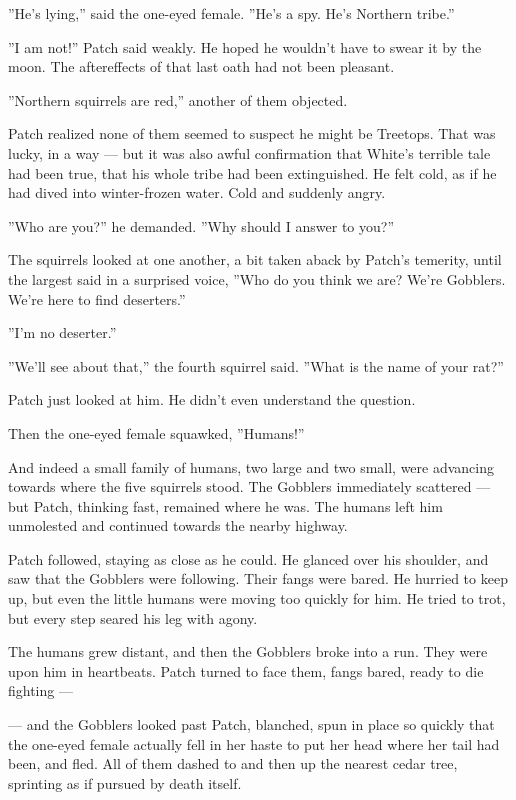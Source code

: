 \documentclass[12pt]{book}
\begin{document}
''He's lying,'' said the one-eyed female. ''He's a spy. He's Northern
tribe.''

''I am not!'' Patch said weakly. He hoped he wouldn't have to swear it
by the moon. The aftereffects of that last oath had not been pleasant.

''Northern squirrels are red,'' another of them objected.

Patch realized none of them seemed to suspect he might be
Treetops. That was lucky, in a way --- but it was also awful
confirmation that White's terrible tale had been true, that his whole
tribe had been extinguished. He felt cold, as if he had dived into
winter-frozen water. Cold and suddenly angry.

''Who are you?'' he demanded. ''Why should I answer to you?''

The squirrels looked at one another, a bit taken aback by Patch's
temerity, until the largest said in a surprised voice, ''Who do you
think we are? We're Gobblers. We're here to find deserters.''

''I'm no deserter.''

''We'll see about that,'' the fourth squirrel said. ''What is the name
of your rat?''

Patch just looked at him. He didn't even understand the question.

Then the one-eyed female squawked, ''Humans!''

And indeed a small family of humans, two large and two small, were
advancing towards where the five squirrels stood. The Gobblers
immediately scattered --- but Patch, thinking fast, remained where he
was. The humans left him unmolested and continued towards the nearby
highway.

Patch followed, staying as close as he could. He glanced over his
shoulder, and saw that the Gobblers were following. Their fangs were
bared. He hurried to keep up, but even the little humans were moving
too quickly for him. He tried to trot, but every step seared his leg
with agony.

The humans grew distant, and then the Gobblers broke into a run. They
were upon him in heartbeats. Patch turned to face them, fangs bared,
ready to die fighting ---

--- and the Gobblers looked past Patch, blanched, spun in place so
quickly that the one-eyed female actually fell in her haste to put her
head where her tail had been, and fled. All of them dashed to and then
up the nearest cedar tree, sprinting as if pursued by death itself.
\end{document}
